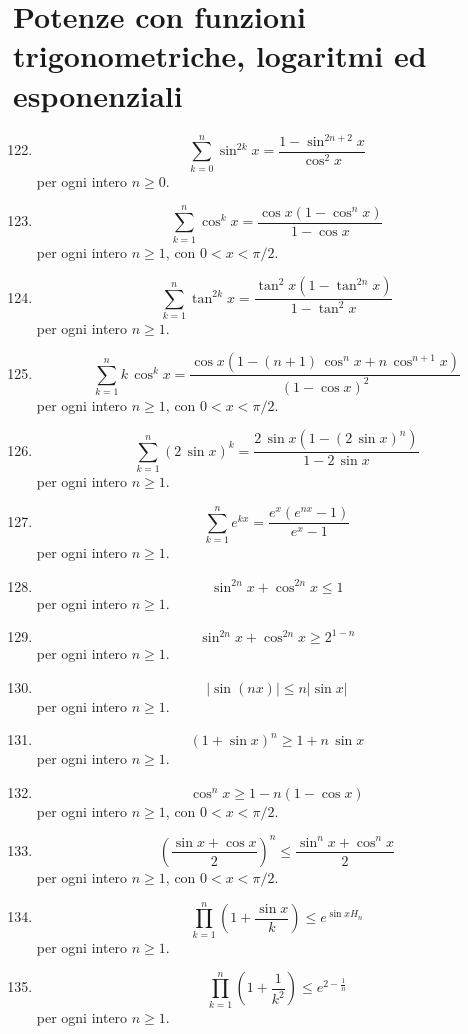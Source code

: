 \documentclass[11pt,a4paper]{article}
\begin{document}
\section*{Potenze con funzioni trigonometriche, logaritmi ed esponenziali}
\begin{enumerate}
\setcounter{enumi}{121}
\item \[ \sum_{k=0}^{n} \sin^{2k} x = \frac{1 - \sin^{2n + 2} x}{\cos^{2} x} \]
{\small per ogni intero $n\ge 0$.}
\item \[ \sum_{k=1}^{n} \cos^{k} x = \frac{\cos x\left(1 - \cos^{n} x\right)}{1 - \cos x} \]
{\small per ogni intero $n\ge 1$, con $0<x<\pi/2$.}
\item \[ \sum_{k=1}^{n} \tan^{2k} x = \frac{\tan^{2} x\left(1 - \tan^{2n} x\right)}{1 - \tan^{2} x} \]
{\small per ogni intero $n\ge 1$.}
\item \[ \sum_{k=1}^{n} k\,\cos^{k} x = \frac{\cos x\left(1 - \left(n + 1\right)\,\cos^{n} x + n\,\cos^{n + 1} x\right)}{\left(1 - \cos x\right)^{2}} \]
{\small per ogni intero $n\ge 1$, con $0<x<\pi/2$.}
\item \[ \sum_{k=1}^{n} \left(2\,\sin x\right)^{k} = \frac{2\,\sin x\left(1 - \left(2\,\sin x\right)^{n}\right)}{1 - 2\,\sin x} \]
{\small per ogni intero $n\ge 1$.}
\item \[ \sum_{k=1}^{n} e^{k x} = \frac{e^{x}\left(e^{n x} - 1\right)}{e^{x} - 1} \]
{\small per ogni intero $n\ge 1$.}
\item \[ \sin^{2n} x + \cos^{2n} x \le 1 \]
{\small per ogni intero $n\ge 1$.}
\item \[ \sin^{2n} x + \cos^{2n} x \ge 2^{1 - n} \]
{\small per ogni intero $n\ge 1$.}
\item \[ \left|\sin\left(n x\right)\right| \le n\left|\sin x\right| \]
{\small per ogni intero $n\ge 1$.}
\item \[ \left(1 + \sin x\right)^{n} \ge 1 + n\,\sin x \]
{\small per ogni intero $n\ge 1$.}
\item \[ \cos^{n} x \ge 1 - n\left(1 - \cos x\right) \]
{\small per ogni intero $n\ge 1$, con $0<x<\pi/2$.}
\item \[ \left(\frac{\sin x + \cos x}{2}\right)^{n} \le \frac{\sin^{n} x + \cos^{n} x}{2} \]
{\small per ogni intero $n\ge 1$, con $0<x<\pi/2$.}
\item \[ \prod_{k=1}^{n} \left(1 + \frac{\sin x}{k}\right) \le e^{\sin x H_{n}} \]
{\small per ogni intero $n\ge 1$.}
\item \[ \prod_{k=1}^{n} \left(1 + \frac{1}{k^{2}}\right) \le e^{2 - \frac{1}{n}} \]
{\small per ogni intero $n\ge 1$.}

\end{enumerate}
\end{document}
